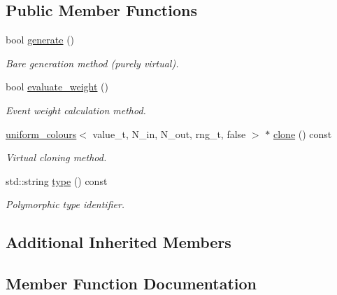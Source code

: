\subsection*{Public Member Functions}
\begin{DoxyCompactItemize}
\item 
bool \hyperlink{a00558_ad9883f19eca4ca64dd47a781defd9ce1}{generate} ()
\begin{DoxyCompactList}\small\item\em \textquotesingle{}Bare generation\textquotesingle{} method (purely virtual). \end{DoxyCompactList}\item 
\hypertarget{a00558_a6c250ce6823efeba1bbead4481665a1a}{}bool \hyperlink{a00558_a6c250ce6823efeba1bbead4481665a1a}{evaluate\+\_\+weight} ()\label{a00558_a6c250ce6823efeba1bbead4481665a1a}

\begin{DoxyCompactList}\small\item\em Event weight calculation method. \end{DoxyCompactList}\item 
\hypertarget{a00558_af8f2ccb01b566ea8474e50c3bb1eabc9}{}\hyperlink{a00557}{uniform\+\_\+colours}$<$ value\+\_\+t, N\+\_\+in, N\+\_\+out, rng\+\_\+t, false $>$ $\ast$ \hyperlink{a00558_af8f2ccb01b566ea8474e50c3bb1eabc9}{clone} () const \label{a00558_af8f2ccb01b566ea8474e50c3bb1eabc9}

\begin{DoxyCompactList}\small\item\em Virtual cloning method. \end{DoxyCompactList}\item 
\hypertarget{a00558_a659e024a65116badf2b1744d10c1f1d2}{}std\+::string \hyperlink{a00558_a659e024a65116badf2b1744d10c1f1d2}{type} () const \label{a00558_a659e024a65116badf2b1744d10c1f1d2}

\begin{DoxyCompactList}\small\item\em Polymorphic type identifier. \end{DoxyCompactList}\end{DoxyCompactItemize}
\subsection*{Additional Inherited Members}


\subsection{Member Function Documentation}
\hypertarget{a00558_ad9883f19eca4ca64dd47a781defd9ce1}{}
